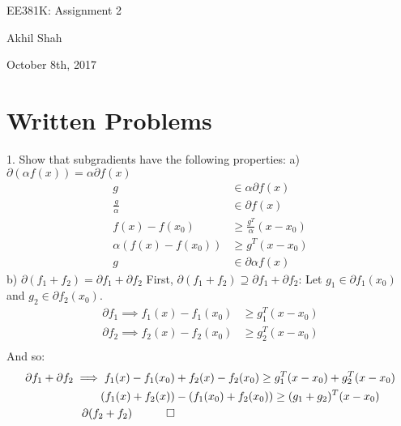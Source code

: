 \documentclass{article}
\begin{document}
\begin{center}
    {\huge EE381K: Assignment 2}
\end{center}
\begin{center}
    Akhil Shah
\end{center}
\begin{center}
    October 8th, 2017
\end{center}

\section{Written Problems}
1. Show that subgradients have the following properties: \newline\newline
a) $\partial(\alpha f(x)) = \alpha\partial f(x)$
\begin{align*}
	g &\in \alpha\partial f(x) \\
	\frac{g}{\alpha} &\in \partial f(x) \\
	f(x) - f(x_0) &\geq \frac{g^T}{\alpha}(x - x_0) \\
	\alpha(f(x) - f(x_0)) &\geq g^T(x - x_0) \\
	g &\in \partial \alpha f(x)
\end{align*}
b) $\partial(f_1 + f_2) = \partial f_1 + \partial f_2$ \newline\newline
First, $\partial(f_1 + f_2) \supseteq \partial f_1 + \partial f_2$: \newline\newline
Let $g_1 \in \partial f_1(x_0)$ and $g_2 \in \partial f_2(x_0)$.
\begin{align*}
	\partial f_1 \implies f_1(x) - f_1(x_0) &\geq g_1^T(x - x_0) \\
	\partial f_2 \implies f_2(x) - f_2(x_0) &\geq g_2^T(x - x_0) \\
\end{align*}
And so:
\begin{align*}
	\partial f_1 + \partial f_2 \implies f_1(x) -f_1(x_0) &+ f_2(x) - f_2(x_0) \geq g_1^T(x- x_0) + g_2^T(x - x_0) \\
	(f_1(x) + f_2(x)) &- (f_1(x_0) + f_2(x_0)) \geq (g_1 + g_2)^T(x - x_0) \\ 
	\partial (f_2 + f_2) \quad \qed
\end{align*}
\end{document}

